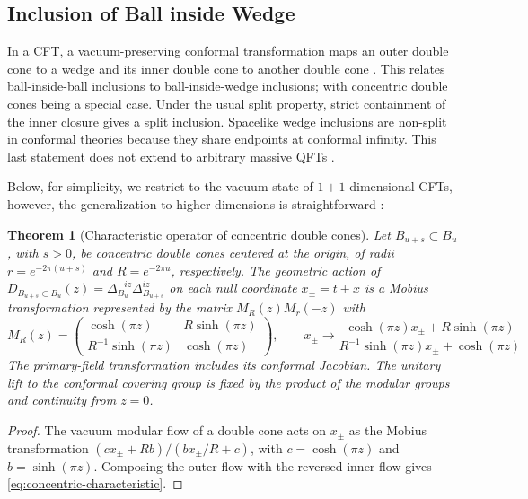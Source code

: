 \documentclass[a4paper,11pt]{article}
\newtheorem{theorem}{Theorem}
\theoremstyle{definition}
\begin{document}
\subsection{Inclusion of Ball inside Wedge}
\label{subsec:ball-inside-wedge}

In a CFT, a vacuum-preserving conformal transformation maps an outer double cone to a wedge and its inner double cone to another double cone \cite{BrunettiGuidoLongo1993}. This relates ball-inside-ball inclusions to ball-inside-wedge inclusions; with concentric double cones being a special case. Under the usual split property, strict containment of the inner closure gives a split inclusion. Spacelike wedge inclusions are non-split in conformal theories because they share endpoints at conformal infinity. This last statement does not extend to arbitrary massive QFTs \cite{Tanimoto2014}.

Below, for simplicity, we restrict to the vacuum state of $1+1$-dimensional CFTs, however, the generalization to higher dimensions is straightforward \cite{}:
\begin{theorem}[Characteristic operator of concentric double cones]
\label{thm:concentric-characteristic}
Let $B_{u+s}\subset B_u$, with $s>0$, be concentric double cones centered at the origin, of radii $r=e^{-2\pi(u+s)}$ and $R=e^{-2\pi u}$, respectively. The geometric action of $D_{B_{u+s}\subset B_u}(z)=\Delta_{B_u}^{-iz}\Delta_{B_{u+s}}^{iz}$ on each null coordinate $x_\pm=t\pm x$ is a Mobius transformation represented by the matrix $ M_R(z)M_r(-z)$ 
with 
\begin{equation}
 M_R(z)=
 \begin{pmatrix}
  \cosh(\pi z)&R\sinh(\pi z)\\
  R^{-1}\sinh(\pi z)&\cosh(\pi z)
 \end{pmatrix}, \qquad x_\pm\to \frac{\cosh(\pi z)x_\pm+R\sinh(\pi z)}{R^{-1}\sinh(\pi z)x_\pm +\cosh(\pi z)}
 \label{eq:concentric-characteristic}
\end{equation}
The primary-field transformation includes its conformal Jacobian. The unitary lift to the conformal covering group is fixed by the product of the modular groups and continuity from $z=0$.
\end{theorem}
\begin{proof}
The vacuum modular flow of a double cone acts on $x_\pm$ as the Mobius transformation $(c x_\pm+R b)/(b x_\pm/R+c)$, with $c=\cosh(\pi z)$ and $b=\sinh(\pi z)$. Composing the outer flow with the reversed inner flow gives \eqref{eq:concentric-characteristic}.
\end{proof}
\end{document}
